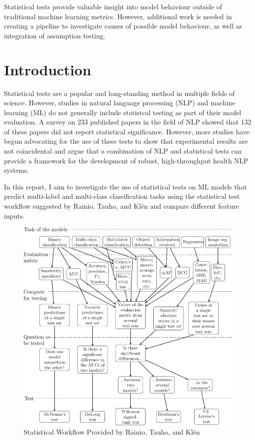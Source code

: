 \documentclass[10.7pt, onecolumn]{article}
\begin{document}
Statistical tests provide valuable insight into model behaviour outside of traditional machine learning metrics. However, additional work is needed in creating a pipeline to investigate causes of possible model behaviour, as well as integration of assumption testing.

\section{Introduction}\label{introduction}
Statistical tests are a popular and long-standing method in multiple fields of science. However, studies in natural language processing (NLP) and machine learning (ML) do not generally include statistcal testing as part of their model evaluation. A survey on 233 published papers in the field of NLP showed that 132 of these papers did not report statistical significance\cite{statsPaper}. However, more studies have begun advocating for the use of these tests to show that experimental results are not coincidental\cite{statsPaper} and argue that a combination of NLP and statistical tests can provide a framework for the development of robust, high-throughput health NLP systems\cite{10.1197/jamia.M3028}. 

In this report, I aim to investigate the use of statistical tests on ML models that predict multi-label and multi-class  classification tasks using the statistical test workflow suggested by Rainio, Tauho, and Klén\cite{statsBased} and compare different feature inputs.

\begin{figure}[H]
  \centering
  \includegraphics[width=\textwidth]{images/41598_2024_56706_Fig3_HTML.png}
  \caption{Statistical Workflow Provided by Rainio, Tauho, and Klén\cite{statsBased}}
  \label{fig:statistical test workflow}
\end{figure}
 
\end{document}
